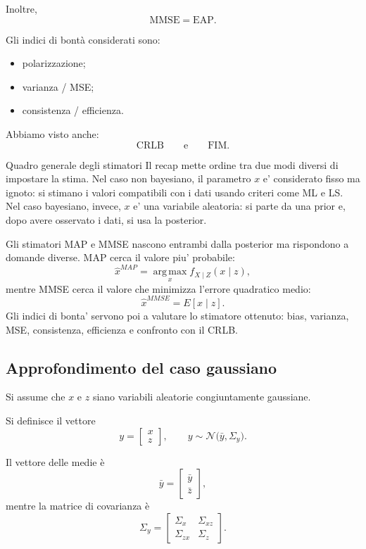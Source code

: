 \documentclass[11pt,a4paper]{article}
\begin{document}
Inoltre,
\[
\mathrm{MMSE}=\mathrm{EAP}.
\]

Gli indici di bontà considerati sono:
\begin{itemize}
    \item polarizzazione;
    \item varianza / MSE;
    \item consistenza / efficienza.
\end{itemize}

Abbiamo visto anche:
\[
\mathrm{CRLB}
\qquad \text{e} \qquad
\mathrm{FIM}.
\]

\begin{spiegazione}{Quadro generale degli stimatori}
Il recap mette ordine tra due modi diversi di impostare la stima. Nel caso non bayesiano, il parametro $x$ e' considerato fisso ma ignoto: si stimano i valori compatibili con i dati usando criteri come ML e LS. Nel caso bayesiano, invece, $x$ e' una variabile aleatoria: si parte da una prior e, dopo avere osservato i dati, si usa la posterior.

Gli stimatori MAP e MMSE nascono entrambi dalla posterior ma rispondono a domande diverse. MAP cerca il valore piu' probabile:
\[
\hat x^{MAP}=\operatorname*{arg\,max}_x f_{X\mid Z}(x\mid z),
\]
mentre MMSE cerca il valore che minimizza l'errore quadratico medio:
\[
\hat x^{MMSE}=E[x\mid z].
\]
Gli indici di bonta' servono poi a valutare lo stimatore ottenuto: bias, varianza, MSE, consistenza, efficienza e confronto con il CRLB.
\end{spiegazione}

\subsection*{Approfondimento del caso gaussiano}

Si assume che \(x\) e \(z\) siano variabili aleatorie congiuntamente gaussiane.

Si definisce il vettore
\[
y=
\begin{bmatrix}
x\\
z
\end{bmatrix},
\qquad
y\sim \mathcal{N}\bigl(\bar y,\Sigma_y\bigr).
\]

Il vettore delle medie è
\[
\bar y=
\begin{bmatrix}
\bar y\\
\bar z
\end{bmatrix},
\]
mentre la matrice di covarianza è
\[
\Sigma_y=
\begin{bmatrix}
\Sigma_x & \Sigma_{xz}\\
\Sigma_{zx} & \Sigma_z
\end{bmatrix}.
\]
\end{document}
